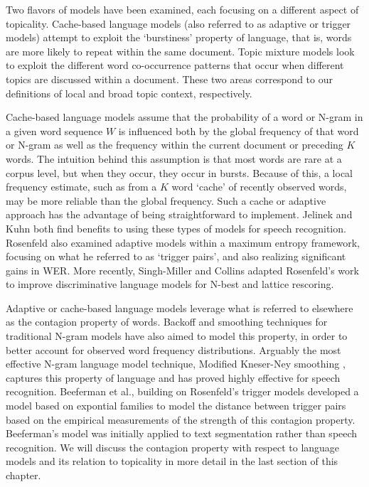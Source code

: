 Two flavors of models have been examined, each focusing on a different aspect of topicality.  Cache-based language models (also referred to as adaptive or trigger models) attempt to exploit the `burstiness' property of language, that is, words are more likely to repeat within the same document.  Topic mixture models look to exploit the different word co-occurrence patterns that occur when different topics are discussed within a document.  These two areas correspond to our definitions of local and broad topic context, respectively. 

Cache-based language models assume that the probability of a word or N-gram in a given word sequence $W$ is influenced both by the global frequency of that word or N-gram as well as the frequency within the current document or preceding $K$ words.  The intuition behind this assumption is that most words are rare at a corpus level, but when they occur, they occur in bursts.   Because of this, a local frequency estimate, such as from a $K$ word `cache' of recently observed words, may be more reliable than the global frequency.  Such a cache or adaptive approach has the advantage of being straightforward to implement.   Jelinek \cite{jelinek1991} and Kuhn \cite{kuhn1990} both find benefits to using these types of models for speech recognition.  Rosenfeld also examined adaptive models within a maximum entropy framework, focusing on what he referred to as `trigger pairs', and also realizing significant gains in WER\cite{rosenfeld1994}.  More recently, Singh-Miller and Collins adapted Rosenfeld's work to improve discriminative language models for N-best and lattice rescoring\cite{singh2007trigger}. 

Adaptive or cache-based language models leverage what is referred to elsewhere as the contagion property of words.   Backoff and smoothing techniques for traditional N-gram models have also aimed to model this property, in order to better account for observed word frequency distributions.  Arguably the most effective N-gram language model technique, Modified Kneser-Ney smoothing \cite{chen1996empirical}, captures this property of language and has proved highly effective for speech recognition.   Beeferman et al., building on Rosenfeld's trigger models developed a model based on expontial families to model the distance between trigger pairs based on the empirical measurements of the strength of this contagion property\cite{beeferman1997}.  Beeferman's model was initially applied to text segmentation\cite{beeferman1999} rather than speech recognition.   We will discuss the contagion property with respect to language models and its relation to topicality in more detail in the last section of this chapter. 

